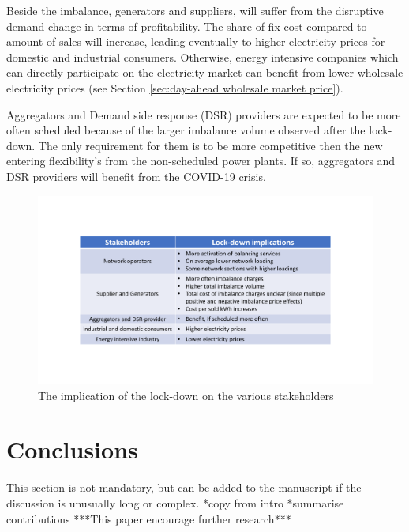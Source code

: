 \documentclass[energies,article,submit,moreauthors,pdftex]{Definitions/mdpi}
\begin{document}
Beside the imbalance, generators and suppliers, will suffer from the disruptive demand change in terms of profitability. The share of fix-cost compared to amount of sales will increase, leading eventually to higher electricity prices for domestic and industrial consumers. Otherwise, energy intensive companies which can directly participate on the electricity market can benefit from lower wholesale electricity prices (see Section \ref{sec:day-ahead wholesale market price}).

Aggregators and Demand side response (DSR) providers are expected to be more often scheduled because of the larger imbalance volume observed after the lock-down. The only requirement for them is to be more competitive then the new entering flexibility's from the non-scheduled power plants. If so, aggregators and DSR providers will benefit from the COVID-19 crisis.

\begin{figure}[H]
\centering
\hspace{-25pt}
\includegraphics[trim={2cm 3cm 2cm 3.5cm},clip,width=1\textwidth]{Graphics/Stakeholder - lock-down implications.pdf}
\caption{The implication of the lock-down on the various stakeholders}
\label{fig:imbalance-price-trade-off}
\end{figure} 



\section{Conclusions}

This section is not mandatory, but can be added to the manuscript if the discussion is unusually long or complex.
*copy from intro
*summarise contributions
***This paper encourage further research***
\end{document}
